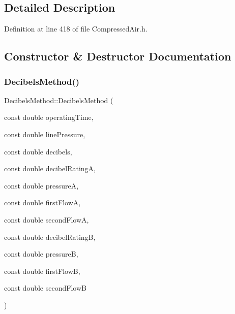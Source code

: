 \subsection{Detailed Description}


Definition at line 418 of file Compressed\+Air.\+h.



\subsection{Constructor \& Destructor Documentation}
\mbox{\label{class_decibels_method_a6c07aed44c1a9a71a0b7118962aa5293}} 
\subsubsection{\texorpdfstring{Decibels\+Method()}{DecibelsMethod()}\hspace{0.1cm}{\footnotesize\ttfamily [1/3]}}
{\footnotesize\ttfamily Decibels\+Method\+::\+Decibels\+Method (\begin{DoxyParamCaption}\item[{const double}]{operating\+Time,  }\item[{const double}]{line\+Pressure,  }\item[{const double}]{decibels,  }\item[{const double}]{decibel\+RatingA,  }\item[{const double}]{pressureA,  }\item[{const double}]{first\+FlowA,  }\item[{const double}]{second\+FlowA,  }\item[{const double}]{decibel\+RatingB,  }\item[{const double}]{pressureB,  }\item[{const double}]{first\+FlowB,  }\item[{const double}]{second\+FlowB }\end{DoxyParamCaption})}

